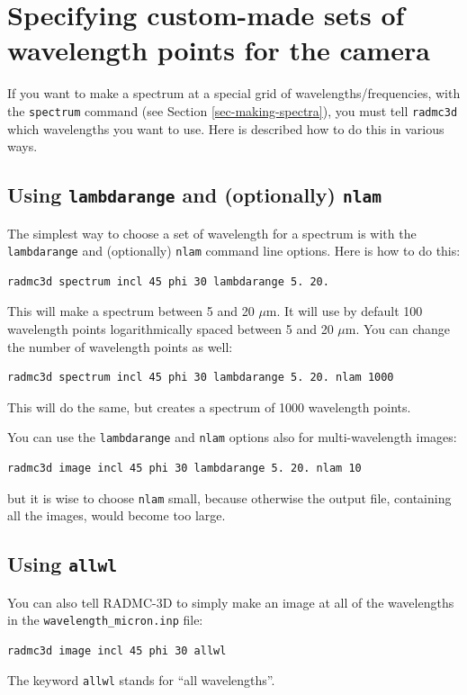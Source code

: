 \documentclass{report}
\newenvironment{asciibox}%
  {\begin{list}{}{%
    \setlength{\topsep}{0.5em}%
    \setlength{\parskip}{0em}%
    \setlength{\parsep}{0em}%
    \setlength{\itemsep}{0em}%
    \setlength{\rightmargin}{0em}%
    \setlength{\leftmargin}{3.0em}%
    \setlength{\labelsep}{1em}%
    \setlength{\labelwidth}{2em}%
  }\normalfont\footnotesize\item}
  {\end{list}}
\begin{document}
\section{Specifying custom-made sets of wavelength points for the camera}
\label{sec-set-camera-frequencies}
%
If you want to make a spectrum at a special grid of wavelengths/frequencies,
with the {\small\tt spectrum} command (see Section \ref{sec-making-spectra}),
you must tell {\small\tt radmc3d} which wavelengths you want to use. Here
is described how to do this in various ways.

\subsection{Using {\small\tt lambdarange} and (optionally) {\small\tt nlam}}
The simplest way to choose a set of wavelength for a spectrum is with the
{\small\tt lambdarange} and (optionally) {\small\tt nlam} command line
options. Here is how to do this:
\begin{asciibox}\begin{verbatim}
radmc3d spectrum incl 45 phi 30 lambdarange 5. 20.
\end{verbatim}\end{asciibox}
This will make a spectrum between 5 and 20 $\mu$m. It will use by default
100 wavelength points logarithmically spaced between 5 and 20 $\mu$m. You 
can change the number of wavelength points as well:
\begin{asciibox}\begin{verbatim}
radmc3d spectrum incl 45 phi 30 lambdarange 5. 20. nlam 1000
\end{verbatim}\end{asciibox}
This will do the same, but creates a spectrum of 1000 wavelength points.

You can use the {\small\tt lambdarange} and {\small\tt nlam} options
also for multi-wavelength images:
\begin{asciibox}\begin{verbatim}
radmc3d image incl 45 phi 30 lambdarange 5. 20. nlam 10
\end{verbatim}\end{asciibox}
but it is wise to choose {\small\tt nlam} small, because otherwise the
output file, containing all the images, would become too large.

\subsection{Using {\small\tt allwl}}
You can also tell RADMC-3D to simply make an image at all of the 
wavelengths in the {\small\tt wavelength\_micron.inp} file:
\begin{asciibox}\begin{verbatim}
radmc3d image incl 45 phi 30 allwl
\end{verbatim}\end{asciibox}
The keyword {\small\tt allwl} stands for ``all wavelengths''. 
\end{document}
